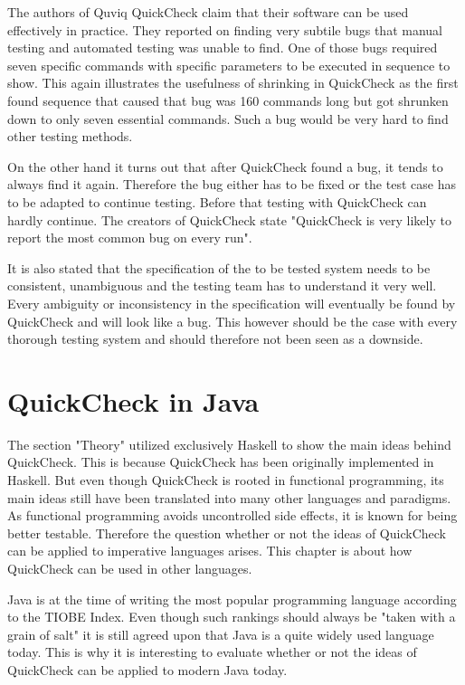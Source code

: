 \documentclass[a4paper, 12pt]{article} %
\begin{document}
The authors of Quviq QuickCheck claim that their software can be used effectively in practice. They reported on finding very subtile bugs that manual testing and automated testing was unable to find. One of those bugs required seven specific commands with specific parameters to be executed in sequence to show. This again illustrates the usefulness of shrinking in QuickCheck as the first found sequence that caused that bug was 160 commands long but got shrunken down to only seven essential commands. Such a bug would be very hard to find other testing methods. \cite{Arts06}

On the other hand it turns out that after QuickCheck found a bug, it tends to always find it again. Therefore the bug either has to be fixed or the test case has to be adapted to continue testing. Before that testing with QuickCheck can hardly continue. The creators of QuickCheck state "QuickCheck is very likely to report the most common bug on every run". \cite{Arts06}

It is also stated that the specification of the to be tested system needs to be consistent, unambiguous and the testing team has to understand it very well. Every ambiguity or inconsistency in the specification will eventually be found by QuickCheck and will look like a bug. This however should be the case with every thorough testing system and should therefore not been seen as a downside. \cite{Arts06}


\section{QuickCheck in Java}

The section "Theory" utilized exclusively Haskell to show the main ideas behind QuickCheck. This is because QuickCheck has been originally implemented in Haskell. But even though QuickCheck is rooted in functional programming, its main ideas still have been translated into many other languages and paradigms. As functional programming avoids uncontrolled side effects, it is known for being better testable. Therefore the question whether or not the ideas of QuickCheck can be applied to imperative languages arises. This chapter is about how QuickCheck can be used in other languages.

Java is at the time of writing the most popular programming language according to the TIOBE Index. \cite{tiobe2018} Even though such rankings should always be "taken with a grain of salt" it is still agreed upon that Java is a quite widely used language today. This is why it is interesting to evaluate whether or not the ideas of QuickCheck can be applied to modern Java today.
\end{document}
